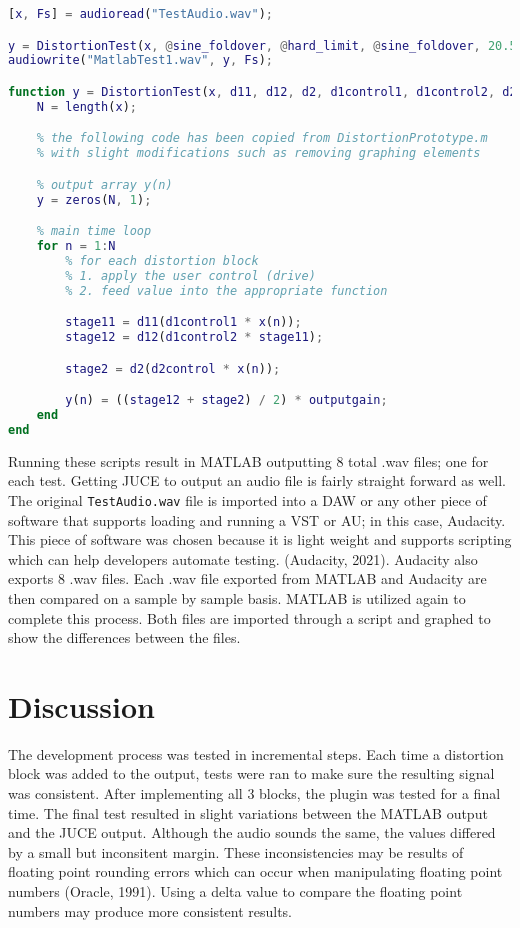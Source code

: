 \documentclass{article}
\begin{document}
\begin{lstlisting}[language=MATLAB]
% Example test case
[x, Fs] = audioread("TestAudio.wav");

y = DistortionTest(x, @sine_foldover, @hard_limit, @sine_foldover, 20.5, 18.1, 14.6, 0.8);
audiowrite("MatlabTest1.wav", y, Fs);

function y = DistortionTest(x, d11, d12, d2, d1control1, d1control2, d2control, outputgain)
    N = length(x);

    % the following code has been copied from DistortionPrototype.m
    % with slight modifications such as removing graphing elements

    % output array y(n)
    y = zeros(N, 1);

    % main time loop
    for n = 1:N
        % for each distortion block
        % 1. apply the user control (drive)
        % 2. feed value into the appropriate function

        stage11 = d11(d1control1 * x(n));
        stage12 = d12(d1control2 * stage11);

        stage2 = d2(d2control * x(n));

        y(n) = ((stage12 + stage2) / 2) * outputgain;
    end
end

\end{lstlisting}

Running these scripts result in MATLAB outputting 8 total .wav files; one for each test.
Getting JUCE to output an audio file is fairly straight forward as well. The original
\lstinline{TestAudio.wav} file is imported into a DAW or any other piece of software that
supports loading and running a VST or AU; in this case, Audacity. This piece of software
was chosen because it is light weight and supports scripting which can help developers automate testing.
(Audacity, 2021). Audacity also exports 8 .wav files. Each .wav file exported from MATLAB and Audacity
are then compared on a sample by sample basis. MATLAB is utilized again to complete this process.
Both files are imported through a script and graphed to show the differences between the files.


\section{Discussion}
The development process was tested in incremental steps. Each time a distortion block
was added to the output, tests were ran to make sure the resulting signal was consistent. After implementing
all 3 blocks, the plugin was tested for a final time. The final test resulted in slight variations between the MATLAB output and the JUCE output.
Although the audio sounds the same, the values differed by a small but inconsitent margin. These inconsistencies may be results of floating point
rounding errors which can occur when manipulating floating point numbers (Oracle, 1991). Using a delta value
to compare the floating point numbers may produce more consistent results.
\end{document}
